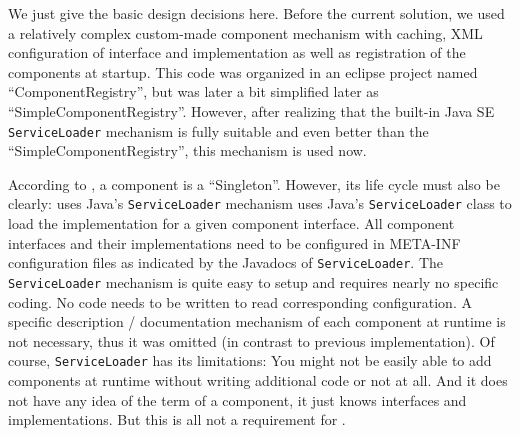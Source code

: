 We just give the basic design decisions here. Before the current solution, we used a relatively complex custom-made component mechanism with caching, XML configuration of interface and implementation as well as registration of the components at startup. This code was organized in an eclipse project named ``ComponentRegistry'', but was later a bit simplified later as ``SimpleComponentRegistry''. However, after realizing that the built-in Java SE \texttt{ServiceLoader} mechanism is fully suitable and even better than the ``SimpleComponentRegistry'', this mechanism is used now.

According to , a component is a ``Singleton''. However, its life cycle must also be clearly:
{%
\COMPcomponentRegistry{} uses Java's \texttt{ServiceLoader} mechanism
}
{%
\COMPcomponentRegistry{} uses Java's \texttt{ServiceLoader} class to load the implementation for a given component interface. All component interfaces and their implementations need to be configured in META-INF configuration files as indicated by the Javadocs of \texttt{ServiceLoader}.
}
{%
The \texttt{ServiceLoader} mechanism is quite easy to setup and requires nearly no specific coding. No code needs to be written to read corresponding configuration. A specific description / documentation mechanism of each component at runtime is not necessary, thus it was omitted (in contrast to previous implementation).
}
{%
Of course, \texttt{ServiceLoader} has its limitations: You might not be easily able to add components at runtime without writing additional code or not at all. And it does not have any idea of the term of a component, it just knows interfaces and implementations. But this is all not a requirement for \LibName{}.
}

